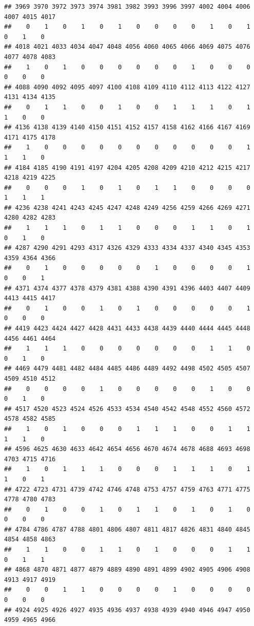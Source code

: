 \documentclass[
]{article}
\begin{document}
\begin{verbatim}
## 3969 3970 3972 3973 3974 3981 3982 3993 3996 3997 4002 4004 4006 4007 4015 4017 
##    0    1    0    1    0    1    0    0    0    0    1    0    1    0    1    0 
## 4018 4021 4033 4034 4047 4048 4056 4060 4065 4066 4069 4075 4076 4077 4078 4083 
##    1    0    1    0    0    0    0    0    0    1    0    0    0    0    0    0 
## 4088 4090 4092 4095 4097 4100 4108 4109 4110 4112 4113 4122 4127 4131 4134 4135 
##    0    1    1    0    0    1    0    0    1    1    1    0    1    1    0    0 
## 4136 4138 4139 4140 4150 4151 4152 4157 4158 4162 4166 4167 4169 4171 4175 4178 
##    1    0    0    0    0    0    0    0    0    0    0    0    1    1    1    0 
## 4184 4185 4190 4191 4197 4204 4205 4208 4209 4210 4212 4215 4217 4218 4219 4225 
##    0    0    0    1    0    1    0    1    1    0    0    0    0    1    1    1 
## 4236 4238 4241 4243 4245 4247 4248 4249 4256 4259 4266 4269 4271 4280 4282 4283 
##    1    1    1    0    1    1    0    0    0    1    1    0    1    0    1    0 
## 4287 4290 4291 4293 4317 4326 4329 4333 4334 4337 4340 4345 4353 4359 4364 4366 
##    0    1    0    0    0    0    0    1    0    0    0    0    1    0    0    1 
## 4371 4374 4377 4378 4379 4381 4388 4390 4391 4396 4403 4407 4409 4413 4415 4417 
##    0    1    0    0    1    0    1    0    0    0    0    0    1    0    0    0 
## 4419 4423 4424 4427 4428 4431 4433 4438 4439 4440 4444 4445 4448 4456 4461 4464 
##    1    1    1    0    0    0    0    0    0    0    1    1    0    0    1    0 
## 4469 4479 4481 4482 4484 4485 4486 4489 4492 4498 4502 4505 4507 4509 4510 4512 
##    0    0    0    0    1    0    0    0    0    0    1    0    0    0    1    0 
## 4517 4520 4523 4524 4526 4533 4534 4540 4542 4548 4552 4560 4572 4578 4582 4585 
##    1    0    1    0    0    0    1    1    1    0    0    1    1    1    1    0 
## 4596 4625 4630 4633 4642 4654 4656 4670 4674 4678 4688 4693 4698 4703 4715 4716 
##    1    0    1    1    1    0    0    0    1    1    1    0    1    1    0    1 
## 4722 4723 4731 4739 4742 4746 4748 4753 4757 4759 4763 4771 4775 4778 4780 4783 
##    0    1    0    0    1    0    1    1    0    1    0    1    0    0    0    0 
## 4784 4786 4787 4788 4801 4806 4807 4811 4817 4826 4831 4840 4845 4854 4858 4863 
##    1    1    0    0    1    1    0    1    0    0    0    1    1    0    1    1 
## 4868 4870 4871 4877 4879 4889 4890 4891 4899 4902 4905 4906 4908 4913 4917 4919 
##    0    0    1    1    0    0    0    0    1    0    0    0    0    0    0    0 
## 4924 4925 4926 4927 4935 4936 4937 4938 4939 4940 4946 4947 4950 4959 4965 4966 

\end{verbatim}
\end{document}
